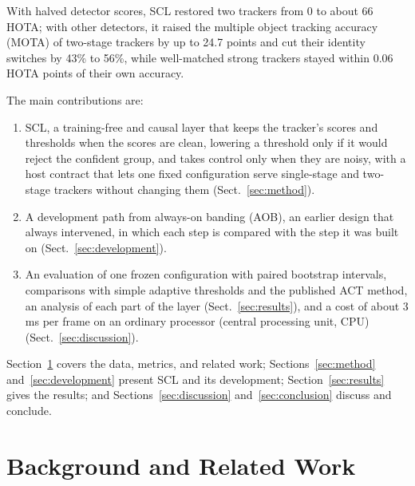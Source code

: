 \documentclass[pdflatex,sn-mathphys-num,iicol]{sn-jnl}
\newcommand{\scl}{SCL}
\newcommand{\aob}{AOB}
\begin{document}
With halved detector scores, \scl{} restored two trackers from 0 to about 66 HOTA; with other
detectors, it raised the multiple object tracking accuracy (MOTA) of two-stage trackers by up to
24.7 points and cut their identity switches by 43\% to 56\%, while well-matched strong trackers
stayed within 0.06 HOTA points of their own accuracy.

The main contributions are:
\begin{enumerate}
\item \scl{}, a training-free and causal layer that keeps the tracker's scores and thresholds when
      the scores are clean, lowering a threshold only if it would reject the confident group, and
      takes control only when they are noisy, with a host contract that lets one fixed
      configuration serve single-stage and two-stage trackers without changing them
      (Sect.~\ref{sec:method}).
\item A development path from always-on banding (\aob{}), an earlier design that always
      intervened, in which each step is compared with the step it was built on
      (Sect.~\ref{sec:development}).
\item An evaluation of one frozen configuration with paired bootstrap intervals, comparisons with
      simple adaptive thresholds and the published ACT method, an analysis of each part of the
      layer (Sect.~\ref{sec:results}), and a cost of about 3 ms per frame on an ordinary processor
      (central processing unit, CPU) (Sect.~\ref{sec:discussion}).
\end{enumerate}

Section~\ref{sec:related} covers the data, metrics, and related work;
Sections~\ref{sec:method} and~\ref{sec:development} present \scl{} and its development;
Section~\ref{sec:results} gives the results; and Sections~\ref{sec:discussion}
and~\ref{sec:conclusion} discuss and conclude.
\section{Background and Related Work}\label{sec:related}
\end{document}
